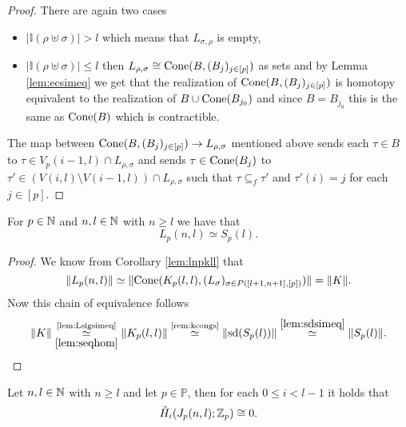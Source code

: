 \begin{proof}
  There are again two cases
  \begin{itemize}
    \item $\left|\mathbb{I}(\rho \uplus \sigma)\right| > l$ which means that $L_{\sigma,\rho}$ is empty,
    \item $\left|\mathbb{I}(\rho \uplus \sigma)\right| \leq l$ then $L_{\rho, \sigma} \cong {\rm Cone}(B, (B_j)_{j\in [p]})$ as sets and by Lemma \ref{lem:ecsimeq} we get that the realization of ${\rm Cone}(B, (B_j)_{j \in [p]})$ is homotopy equivalent to the realization of $B \cup {\rm Cone}(B_{j_0})$ and since $B = B_{j_0}$ this is the same as ${\rm Cone}(B)$ which is contractible.
    \end{itemize}
    The map between ${\rm Cone}(B, (B_j)_{j\in [p]}) \to L_{\rho, \sigma}$ mentioned above sends each $\tau \in B$ to $\tau \in V_p(i-1, l) \cap L_{\rho, \sigma}$ and sends $\tau \in {\rm Cone}(B_j)$ to $\tau' \in (V(i,l) \setminus V(i-1,l))\cap L_{\rho,\sigma}$ such that $\tau \subseteq_f \tau'$ and $\tau'(i) = j$ for each $j \in [p]$.
\end{proof}

\begin{col}\label{col:lspl}
  For $p \in \mathbb{N}$ and $n,l\in \mathbb{N}$ with $n \geq l$ we have that \[L_p(n,l) \simeq S_p(l).\]
\end{col}

\begin{proof}
  We know from Corollary \ref{lem:lnpkll} that \[\lVert L_p(n,l) \rVert \simeq \lVert{\rm Cone}(K_p(l,l), (L_\sigma)_{\sigma\in P([l+1,n+1],[p])})\rVert = \lVert K \rVert.\] Now this chain of equivalence follows
  \begin{equation*}
    \lVert K \rVert \underset{\ref{lem:seqhom}}{\overset{\text{\ref{lem:Lsigsimeq}}}{\simeq}} \lVert K_p(l,l) \rVert \overset{\text{\ref{rem:kcongs}}}{\simeq} \lVert {\rm sd}(S_p(l)) \rVert \overset{\ref{lem:sdsimeq}}{\simeq} \lVert S_p(l) \rVert.
  \end{equation*}
\end{proof}

\begin{lemma}\label{lem:jc0}
  Let $n,l \in \mathbb{N}$ with $n \geq l$ and let $p \in \mathbb{P}$, then for each $0 \leq i < l-1$ it holds that
  \begin{equation*}
    \tilde{H}_i(J_p(n,l); \mathbb{Z}_p) \cong 0.
  \end{equation*}
\end{lemma}

